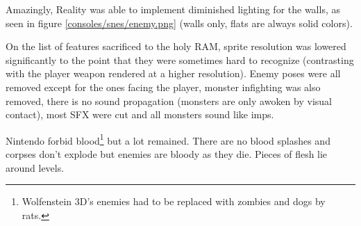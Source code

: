 \par
\vspace{-10pt}
Amazingly, Reality was able to implement diminished lighting for the walls, as seen in figure \ref{consoles/snes/enemy.png} (walls only, flats are always solid colors).\\
\par
 On the list of features sacrificed to the holy RAM, sprite resolution was lowered significantly to the point that they were sometimes hard to recognize (contrasting with the player weapon rendered at a higher resolution). Enemy poses were all removed except for the ones facing the player, monster infighting was also removed, there is no sound propagation (monsters are only awoken by visual contact), most SFX were cut and all monsters sound like imps.
\\
\par
Nintendo forbid blood\footnote{Wolfenstein 3D's enemies had to be replaced with zombies and dogs by rats.} but a lot remained. There are no blood splashes and corpses don't explode but enemies are bloody as they die. Pieces of flesh lie around levels.	


   
